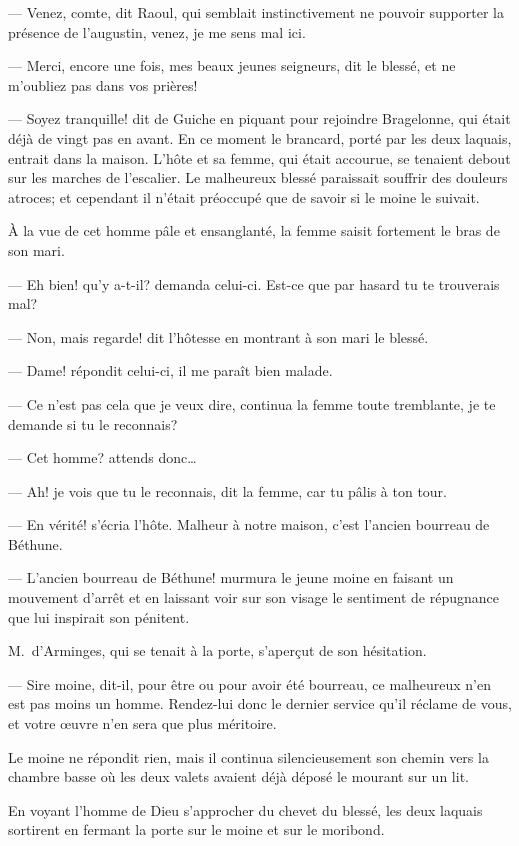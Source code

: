 — Venez, comte, dit Raoul, qui semblait instinctivement ne pouvoir supporter la présence de l'augustin, venez, je me sens mal ici.

— Merci, encore une fois, mes beaux jeunes seigneurs, dit le blessé, et ne m'oubliez pas dans vos prières!

— Soyez tranquille! dit de Guiche en piquant pour rejoindre Bragelonne, qui était déjà de vingt pas en avant.
En ce moment le brancard, porté par les deux laquais, entrait dans la maison. L'hôte et sa femme, qui était accourue, se tenaient debout sur les marches de l'escalier. Le malheureux blessé paraissait souffrir des douleurs atroces; et cependant il n'était préoccupé que de savoir si le moine le suivait.

À la vue de cet homme pâle et ensanglanté, la femme saisit fortement le bras de son mari.

— Eh bien! qu'y a-t-il? demanda celui-ci. Est-ce que par hasard tu te trouverais mal?

— Non, mais regarde! dit l'hôtesse en montrant à son mari le blessé.

— Dame! répondit celui-ci, il me paraît bien malade.

— Ce n'est pas cela que je veux dire, continua la femme toute tremblante, je te demande si tu le reconnais?

— Cet homme? attends donc\dots

— Ah! je vois que tu le reconnais, dit la femme, car tu pâlis à ton tour.

— En vérité! s'écria l'hôte. Malheur à notre maison, c'est l'ancien bourreau de Béthune.

— L'ancien bourreau de Béthune! murmura le jeune moine en faisant un mouvement d'arrêt et en laissant voir sur son visage le sentiment de répugnance que lui inspirait son pénitent.

M.~d'Arminges, qui se tenait à la porte, s'aperçut de son hésitation.

— Sire moine, dit-il, pour être ou pour avoir été bourreau, ce malheureux n'en est pas moins un homme. Rendez-lui donc le dernier service qu'il réclame de vous, et votre œuvre n'en sera que plus méritoire.

Le moine ne répondit rien, mais il continua silencieusement son chemin vers la chambre basse où les deux valets avaient déjà déposé le mourant sur un lit.

En voyant l'homme de Dieu s'approcher du chevet du blessé, les deux laquais sortirent en fermant la porte sur le moine et sur le moribond.


